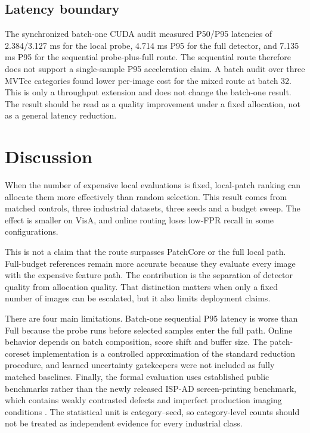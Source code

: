 \documentclass[pdflatex,sn-vancouver-num]{sn-jnl}
\begin{document}
\subsection{Latency boundary}
The synchronized batch-one CUDA audit measured P50/P95 latencies of 2.384/3.127 ms for the local probe, 4.714 ms P95 for the full detector, and 7.135 ms P95 for the sequential probe-plus-full route. The sequential route therefore does not support a single-sample P95 acceleration claim. A batch audit over three MVTec categories found lower per-image cost for the mixed route at batch 32. This is only a throughput extension and does not change the batch-one result. The result should be read as a quality improvement under a fixed allocation, not as a general latency reduction.

\section{Discussion}\label{sec:discussion}

When the number of expensive local evaluations is fixed, local-patch ranking can allocate them more effectively than random selection. This result comes from matched controls, three industrial datasets, three seeds and a budget sweep. The effect is smaller on VisA, and online routing loses low-FPR recall in some configurations.

This is not a claim that the route surpasses PatchCore or the full local path. Full-budget references remain more accurate because they evaluate every image with the expensive feature path. The contribution is the separation of detector quality from allocation quality. That distinction matters when only a fixed number of images can be escalated, but it also limits deployment claims.

There are four main limitations. Batch-one sequential P95 latency is worse than Full because the probe runs before selected samples enter the full path. Online behavior depends on batch composition, score shift and buffer size. The patch-coreset implementation is a controlled approximation of the standard reduction procedure, and learned uncertainty gatekeepers were not included as fully matched baselines. Finally, the formal evaluation uses established public benchmarks rather than the newly released ISP-AD screen-printing benchmark, which contains weakly contrasted defects and imperfect production imaging conditions \cite{krassnig2026isp}. The statistical unit is category--seed, so category-level counts should not be treated as independent evidence for every industrial class.
\end{document}
